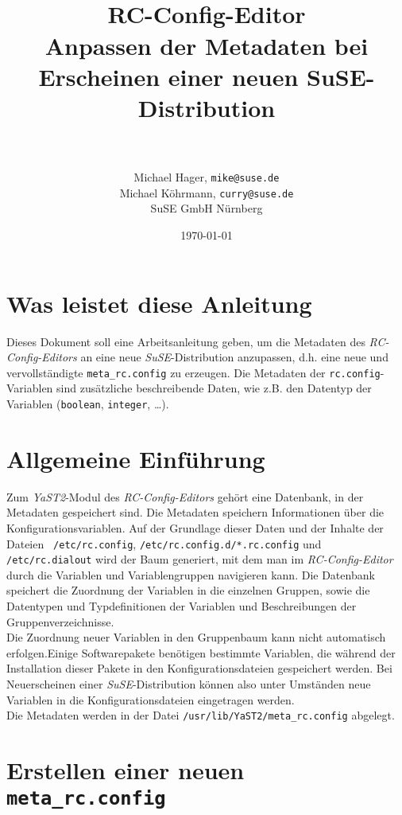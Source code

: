 \documentclass[pdftex,titlepage,10pt]{article}
\title{%
  \HRule\\[0.7cm]
  RC-Config-Editor\\[0.5em]
  Anpassen der Metadaten bei Erscheinen einer neuen SuSE-Distribution\\[0.5cm]
  \HRule\\\vfill}
\author{Michael Hager, {\tt mike@suse.de}\\
  Michael K\"ohrmann, {\tt curry@suse.de}\\
  SuSE GmbH N\"urnberg}
\date{\today}
\begin{document}
\setlength{\parindent}{0pt}
\pagestyle{headings}
\maketitle
\section{Was leistet diese Anleitung}
Dieses Dokument soll eine Arbeitsanleitung geben, um die Metadaten des
{\em RC-Config-Editors} an eine neue {\em SuSE}-Distribution
anzupassen, d.h. eine neue und vervollst\"andigte {\tt meta\_rc.config}
zu erzeugen. Die Metadaten der {\tt rc.config}-Variablen sind
zus\"atzliche beschreibende Daten, wie z.B. den Datentyp der Variablen
({\tt boolean}, {\tt integer}, \ldots).\\

\section{Allgemeine Einf\"uhrung}
Zum {\em YaST2}-Modul des {\em RC-Config-Editors} geh\"ort eine
Datenbank, in der Metadaten gespeichert sind. Die Metadaten speichern
Informationen \"uber die Konfigurationsvariablen.
Auf der Grundlage dieser Daten und der Inhalte der Dateien {\tt
  /etc/rc.config}, {\tt /etc/rc.config.d/*.rc.config} und {\tt
  /etc/rc.dialout} wird der Baum generiert, mit dem man im 
{\em RC-Config-Editor} durch die Variablen und Variablengruppen
navigieren kann. Die Datenbank speichert die Zuordnung der Variablen
in die einzelnen Gruppen, sowie die Datentypen und Typdefinitionen der
Variablen und Beschreibungen der Gruppenverzeichnisse.\\

Die Zuordnung neuer Variablen in den Gruppenbaum kann nicht
automatisch erfolgen.Einige Softwarepakete ben\"otigen bestimmte Variablen,
die w\"ahrend der Installation dieser Pakete in den Konfigurationsdateien
gespeichert werden. Bei Neuerscheinen einer {\em
  SuSE}-Distribution k\"onnen also unter Umst\"anden neue Variablen in die
Konfigurationsdateien eingetragen werden.\\

Die Metadaten werden in der Datei {\tt /usr/lib/YaST2/meta\_rc.config}
abgelegt.
\newpage
\section{Erstellen einer neuen {\tt meta\_rc.config}}
\end{document}
